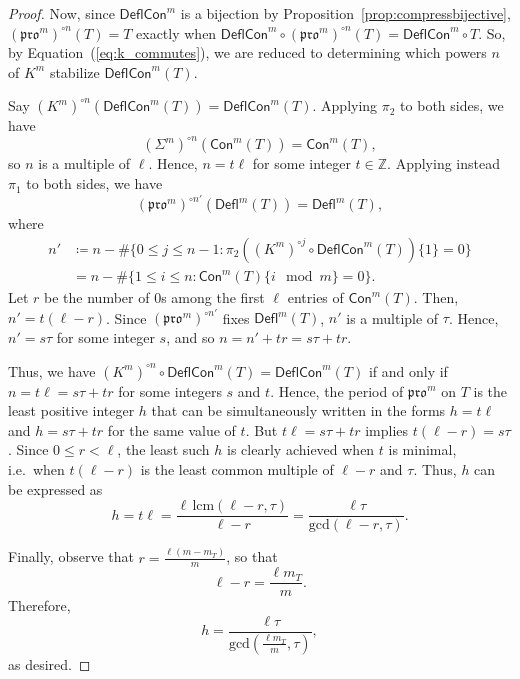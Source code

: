 \documentclass[12pt]{amsart}
\theoremstyle{definition}
\theoremstyle{remark}
\numberwithin{equation}{section}
\newcommand{\pro}{\mathfrak{pro}}
\newcommand{\deflate}{\ensuremath{\mathsf{Defl}}}
\newcommand{\content}{\ensuremath{\mathsf{Con}}}
\newcommand{\compress}{\ensuremath{\mathsf{DeflCon}}}
\begin{document}
\begin{proof}
Now, since $\compress^m$ is a bijection by Proposition~\ref{prop:compressbijective}, $(\pro^m)^{\circ n}(T) = T$ exactly when $\compress^m \circ (\pro^m)^{\circ n}(T) = \compress^m \circ T$. So, by Equation~(\ref{eq:k_commutes}), we are reduced to determining which powers $n$ of $K^m$ stabilize $\compress^m(T)$.
 

 
Say $(K^m)^{\circ n}(\compress^m(T)) = \compress^m(T)$. Applying $\pi_2$ to both sides, we have \[ (\Sigma^m)^{\circ n}(\content^m(T)) = \content^m(T), \] so $n$ is a multiple of $\ell$. Hence, $n = t \ell$ for some integer $t \in \mathbb{Z}$.  Applying instead $\pi_1$ to both sides, we have \[ (\pro^m)^{\circ n'}(\deflate^m(T)) = \deflate^m(T), \] where 
\begin{align*}
n' &\coloneqq n - \# \{ 0 \leq j \leq n-1 : \pi_2 ((K^m)^{\circ j} \circ \compress^m(T)) \lbrace 1 \rbrace = 0\} \\
&= n - \#  \{ 1 \leq i \leq n : \content^m(T) \lbrace i \mod m \rbrace = 0\}.
\end{align*}
Let $r$ be the number of $0$s among the first $\ell$ entries of $\content^m(T)$. Then, $n' = t(\ell - r)$. Since $(\pro^m)^{\circ n'}$ fixes $\deflate^m(T)$, $n'$ is a multiple of $\tau$. Hence, $n' = s \tau$ for some integer $s$, and so $n = n' + tr = s\tau + tr$.

Thus, we have $(K^m)^{\circ n}  \circ \compress^m(T) = \compress^m(T)$ if and only if $n = t \ell = s \tau + t  r$ for some integers $s$ and $t$. Hence, the period of $\pro^m$ on $T$ is the least positive integer $h$ that can be simultaneously written in the forms $h = t \ell$ and $h=s \tau + t r$ for the same value of $t$. But $t \ell = s\tau + tr$ implies $t(\ell-r) = s\tau$. Since $0 \leq r < \ell$, the least such $h$ is clearly achieved when $t$ is minimal, i.e.\ when $t(\ell-r)$ is the least common multiple of $\ell-r$ and $\tau$. Thus, $h$ can be expressed as 
\begin{equation}\label{eq:period}
h = t \ell = \frac{\ell \, \text{lcm}(\ell-r,\tau)}{\ell-r} = \frac{\ell \tau}{\text{gcd}(\ell-r,\tau)}.
\end{equation}

Finally, observe that $r = \frac{\ell (m-m_T)}{m}$, so that \[ \ell - r = \frac{\ell m_T}{m}.\]
Therefore,
\[ h = \frac{\ell \tau}{\text{gcd}(\frac{\ell m_T}{m},\tau)}, \]
as desired. 
\end{proof}
\end{document}
